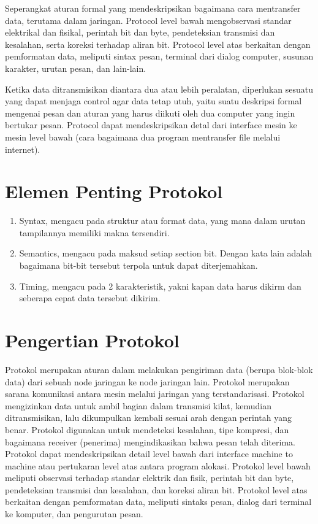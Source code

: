\documentclass{article}
\begin{document}
 Seperangkat aturan formal yang mendeskripsikan bagaimana cara mentransfer data, terutama dalam jaringan. Protocol level bawah
 mengobservasi standar elektrikal dan fisikal, perintah bit dan byte, pendeteksian transmisi dan kesalahan, serta koreksi terhadap 
 aliran bit. Protocol level atas berkaitan dengan pemformatan data, meliputi sintax pesan, terminal dari dialog computer, susunan 
 karakter, urutan pesan, dan lain-lain.
 
 Ketika data ditransmisikan diantara dua atau lebih peralatan, diperlukan sesuatu yang dapat menjaga control agar data tetap utuh, yaitu 
 suatu deskripsi formal mengenai pesan dan aturan yang harus diikuti oleh dua computer yang ingin bertukar pesan. Protocol dapat 
 mendeskripsikan detal dari interface mesin ke mesin level bawah (cara bagaimana dua program mentransfer file melalui internet).
 
 \section{Elemen Penting Protokol}
 \begin{enumerate}
 \item  Syntax, mengacu pada struktur atau format data, yang mana dalam urutan tampilannya memiliki makna tersendiri.
 \item  Semantics, mengacu pada maksud setiap section bit. Dengan kata lain adalah bagaimana bit-bit tersebut terpola untuk dapat 
 diterjemahkan.
 \item  Timing, mengacu pada 2 karakteristik, yakni kapan data harus dikirm dan seberapa cepat data tersebut dikirim.
 \end{enumerate}

 
 \section{Pengertian Protokol}
Protokol merupakan aturan dalam melakukan pengiriman data (berupa blok-blok data) dari sebuah node jaringan ke node jaringan lain.
Protokol merupakan sarana komunikasi antara mesin melalui jaringan yang terstandarisasi. Protokol mengizinkan data untuk ambil bagian 
dalam transmisi kilat, kemudian ditransmisikan, lalu dikumpulkan kembali sesuai arah dengan perintah yang benar. 
Protokol digunakan untuk mendeteksi kesalahan, tipe kompresi, dan bagaimana receiver (penerima) mengindikasikan bahwa pesan telah 
diterima. 
Protokol dapat mendeskripsikan detail level bawah dari interface machine to machine atau pertukaran level atas antara program alokasi. 
Protokol level bawah meliputi observasi terhadap standar elektrik dan fisik, perintah bit dan byte, pendeteksian transmisi dan 
kesalahan, dan koreksi aliran bit. 
Protokol level atas berkaitan dengan pemformatan data, meliputi sintaks pesan, dialog dari terminal ke komputer, dan pengurutan pesan. 
\end{document}
